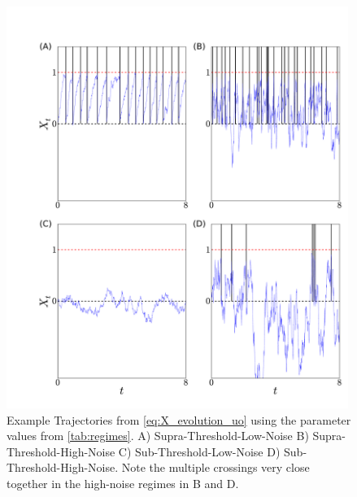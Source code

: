 \begin{figure}[htp] 
\begin{center} 
  \includegraphics[width=0.99\textwidth]{Figs/PathSimulator/path_T=14_combined.pdf} 
  \caption[labelInTOC]{Example Trajectories from \cref{eq:X_evolution_uo} 
  using the parameter values from \cref{tab:regimes}.  
  A) Supra-Threshold-Low-Noise  
  B) Supra-Threshold-High-Noise  
  C) Sub-Threshold-Low-Noise 
  D) Sub-Threshold-High-Noise.  
  Note the multiple crossings very close together in the high-noise regimes 
  in B and D. } 
  \label{fig:regime_path_examples} 
\end{center} 
\end{figure} 
